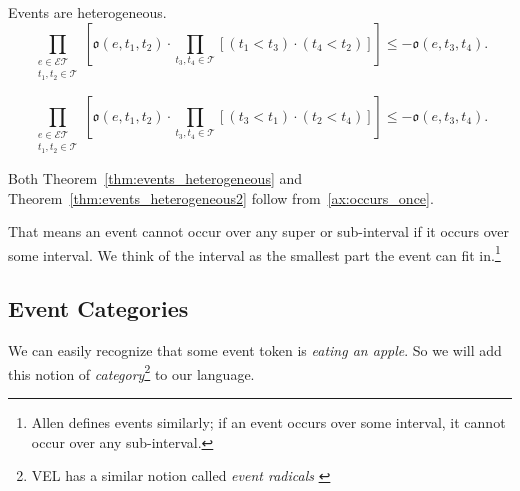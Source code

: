 
\begin{theorem}\label{thm:events_heterogeneous} Events are heterogeneous.
    \begin{equation}
        \prod_{\substack{e \in \mathcal{ET} \\ t_1, t_2 \in \mathcal{T}}} [\mathfrak{o}(e, t_1, t_2) \cdot \prod_{t_3, t_4 \in \mathcal{T}} [(t_1 < t_3) \cdot (t_4 < t_2)]]
        \leq - \mathfrak{o}(e, t_3, t_4).
        \label{eq:events_heterogeneous}
    \end{equation}
\end{theorem}
\begin{theorem}\label{thm:events_heterogeneous2}
    \begin{equation}
        \prod_{\substack{e \in \mathcal{ET} \\ t_1, t_2 \in \mathcal{T}}}[ \mathfrak{o}(e, t_1, t_2) \cdot \prod_{t_3, t_4 \in \mathcal{T}} [(t_3 < t_1) \cdot (t_2 < t_4)]]
        \leq - \mathfrak{o}(e, t_3, t_4).
        \label{eq:events_heterogeneous2}
    \end{equation}
\end{theorem}

Both Theorem~\ref{thm:events_heterogeneous} and Theorem~\ref{thm:events_heterogeneous2} follow from~\ref{ax:occurs_once}.

That means an event cannot occur over any super or sub-interval if it occurs over some interval.
We think of the interval as the smallest part the event can fit in.\footnote{Allen \cite{allen1984towards} defines events similarly; if an event occurs over some interval, it cannot occur over any sub-interval.
}

\subsection{Event Categories}
We can easily recognize that some event token is \textit{eating an apple}. So we will add this notion of \textit{category}\footnote{VEL has a similar notion called \textit{event radicals} \cite{bennett2001unifying}} to our language.


